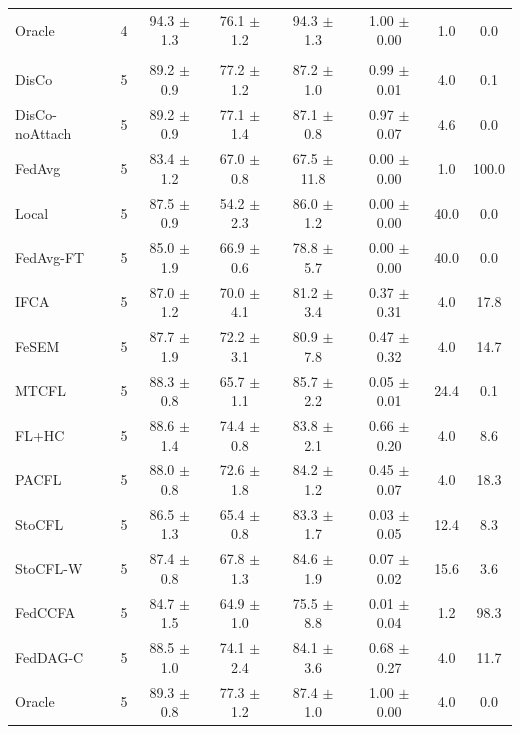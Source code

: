 {\begin{tabular}{l r c c c c c c}
Oracle & 4 & 94.3 $\pm$ 1.3 & 76.1 $\pm$ 1.2 & 94.3 $\pm$ 1.3 & 1.00 $\pm$ 0.00 & 1.0 & 0.0 \\
\addlinespace
\multicolumn{8}{l}{\textit{Minority groups}} \\
DisCo & 5 & 89.2 $\pm$ 0.9 & 77.2 $\pm$ 1.2 & 87.2 $\pm$ 1.0 & 0.99 $\pm$ 0.01 & 4.0 & 0.1 \\
DisCo-noAttach & 5 & 89.2 $\pm$ 0.9 & 77.1 $\pm$ 1.4 & 87.1 $\pm$ 0.8 & 0.97 $\pm$ 0.07 & 4.6 & 0.0 \\
FedAvg & 5 & 83.4 $\pm$ 1.2 & 67.0 $\pm$ 0.8 & 67.5 $\pm$ 11.8 & 0.00 $\pm$ 0.00 & 1.0 & 100.0 \\
Local & 5 & 87.5 $\pm$ 0.9 & 54.2 $\pm$ 2.3 & 86.0 $\pm$ 1.2 & 0.00 $\pm$ 0.00 & 40.0 & 0.0 \\
FedAvg-FT & 5 & 85.0 $\pm$ 1.9 & 66.9 $\pm$ 0.6 & 78.8 $\pm$ 5.7 & 0.00 $\pm$ 0.00 & 40.0 & 0.0 \\
IFCA & 5 & 87.0 $\pm$ 1.2 & 70.0 $\pm$ 4.1 & 81.2 $\pm$ 3.4 & 0.37 $\pm$ 0.31 & 4.0 & 17.8 \\
FeSEM & 5 & 87.7 $\pm$ 1.9 & 72.2 $\pm$ 3.1 & 80.9 $\pm$ 7.8 & 0.47 $\pm$ 0.32 & 4.0 & 14.7 \\
MTCFL & 5 & 88.3 $\pm$ 0.8 & 65.7 $\pm$ 1.1 & 85.7 $\pm$ 2.2 & 0.05 $\pm$ 0.01 & 24.4 & 0.1 \\
FL+HC & 5 & 88.6 $\pm$ 1.4 & 74.4 $\pm$ 0.8 & 83.8 $\pm$ 2.1 & 0.66 $\pm$ 0.20 & 4.0 & 8.6 \\
PACFL & 5 & 88.0 $\pm$ 0.8 & 72.6 $\pm$ 1.8 & 84.2 $\pm$ 1.2 & 0.45 $\pm$ 0.07 & 4.0 & 18.3 \\
StoCFL & 5 & 86.5 $\pm$ 1.3 & 65.4 $\pm$ 0.8 & 83.3 $\pm$ 1.7 & 0.03 $\pm$ 0.05 & 12.4 & 8.3 \\
StoCFL-W & 5 & 87.4 $\pm$ 0.8 & 67.8 $\pm$ 1.3 & 84.6 $\pm$ 1.9 & 0.07 $\pm$ 0.02 & 15.6 & 3.6 \\
FedCCFA & 5 & 84.7 $\pm$ 1.5 & 64.9 $\pm$ 1.0 & 75.5 $\pm$ 8.8 & 0.01 $\pm$ 0.04 & 1.2 & 98.3 \\
FedDAG-C & 5 & 88.5 $\pm$ 1.0 & 74.1 $\pm$ 2.4 & 84.1 $\pm$ 3.6 & 0.68 $\pm$ 0.27 & 4.0 & 11.7 \\
Oracle & 5 & 89.3 $\pm$ 0.8 & 77.3 $\pm$ 1.2 & 87.4 $\pm$ 1.0 & 1.00 $\pm$ 0.00 & 4.0 & 0.0 \\
\bottomrule
\end{tabular}
}
